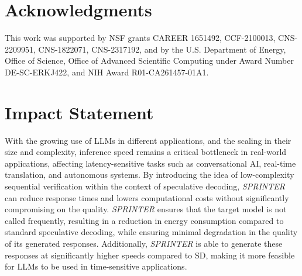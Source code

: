 \documentclass{article}
\theoremstyle{plain}
\theoremstyle{definition}
\theoremstyle{remark}
\begin{document}
\vspace{-6.5pt}
\section*{Acknowledgments}
\vspace{-6.5pt}
This work was supported by NSF grants CAREER 1651492, CCF-2100013, CNS-2209951, CNS-1822071, CNS-2317192, and by the U.S. Department of Energy, Office of Science, Office of Advanced Scientific Computing under Award Number DE-SC-ERKJ422, and NIH Award R01-CA261457-01A1.
\vspace{-6.5pt}
\section*{Impact Statement}
\vspace{-6.5pt}
With the growing use of LLMs in different applications, and the scaling in their size and complexity, inference speed remains a critical bottleneck in real-world applications, affecting latency-sensitive tasks such as conversational AI, real-time translation, and autonomous systems. By introducing the idea of low-complexity sequential verification within the context of speculative decoding, \textit{SPRINTER} can reduce response times and lowers computational costs without significantly compromising on the quality. \textit{SPRINTER} ensures that the target model is not called frequently, resulting in a reduction in energy consumption compared to standard speculative decoding, while ensuring minimal degradation in the quality of its generated responses. Additionally, \textit{SPRINTER} is able to generate these responses at significantly higher speeds compared to SD, making it more feasible for LLMs to be used in time-sensitive applications. 
\vspace{-10pt}



\nocite{langley00}





\newpage
\appendix
\onecolumn
\end{document}
